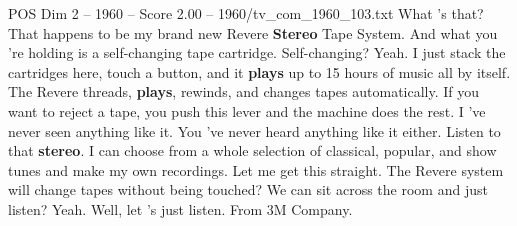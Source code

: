 \begin{textsample}{POS Dim 2 – 1960 – Score 2.00 – 1960/tv\_com\_1960\_103.txt}  \label{ex:f2_pos_026}
What 's that?
That happens to be my brand new Revere \textbf{Stereo} Tape System.
And what you 're holding is a self-changing tape cartridge.
Self-changing?
Yeah.
I just stack the cartridges here, touch a button, and it \textbf{plays} up to 15 hours of music all by itself.
The Revere threads, \textbf{plays}, rewinds, and changes tapes automatically.
If you want to reject a tape, you push this lever and the machine does the rest.
I 've never seen anything like it.
You 've never heard anything like it either.
Listen to that \textbf{stereo}.
I can choose from a whole selection of classical, popular, and show tunes and make my own recordings.
Let me get this straight.
The Revere system will change tapes without being touched?
We can sit across the room and just listen?
Yeah.
Well, let 's just listen.
From 3M Company.

\end{textsample}
